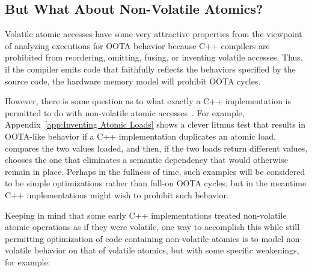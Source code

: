 \documentclass[10]{article}
\begin{document}
\subsection{But What About Non-Volatile Atomics?}
\label{sec:But What About Non-Volatile Atomics?}

Volatile atomic accesses have some very attractive properties from
the viewpoint of analyzing executions for OOTA behavior because C++
compilers are prohibited from reordering, omitting, fusing, or inventing
volatile accesses.
Thus, if the compiler emits code that faithfully reflects the behaviors
specified by the source code, the hardware memory model will prohibit
OOTA cycles.

However, there is some question as to what exactly a C++ implementation
is permitted to do with non-volatile atomic accesses~\cite{JFBastien2015N4455}.
For example,
Appendix~\ref{app:Inventing Atomic Loads}
shows a clever litmus test that results in OOTA-like behavior
if a C++ implementation duplicates an atomic load, compares the two values
loaded, and then, if the two loads return different values, chooses the
one that eliminates a semantic dependency that would otherwise remain
in place.
Perhaps in the fullness of time, such examples will be considered to be
simple optimizations rather than full-on OOTA cycles, but in the meantime
C++ implementations might wish to prohibit such behavior.

Keeping in mind that some early C++ implementations treated non-volatile
atomic operations as if they were volatile, one way to accomplish this
while still permitting optimization of code containing non-volatile
atomics is to model non-volatile behavior on that of volatile atomics,
but with some specific weakenings, for example:
\end{document}
